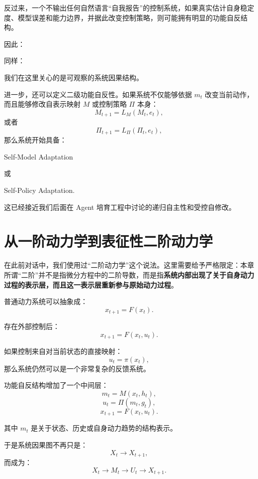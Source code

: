 反过来，一个不输出任何自然语言“自我报告”的控制系统，如果真实估计自身稳定度、模型误差和能力边界，并据此改变控制策略，则可能拥有明显的功能自反结构。

因此：
\begin{statementbox}
\centering
{}
\end{statementbox}

同样：
\begin{statementbox}
\centering
{}
\end{statementbox}

我们在这里关心的是可观察的系统因果结构。

进一步，还可以定义二级功能自反性。如果系统不仅能够依据 \(m_t\) 改变当前动作，而且能够修改自表示映射 \(M\) 或控制策略 \(\Pi\) 本身：
\[
M_{t+1}
=
L_M(M_t,e_t),
\]
或者
\[
\Pi_{t+1}
=
L_\Pi(\Pi_t,e_t),
\]
那么系统开始具备：
\begin{statementbox}
Self-Model Adaptation
\end{statementbox}
或
\begin{statementbox}
Self-Policy Adaptation.
\end{statementbox}

这已经接近我们后面在 Agent 培育工程中讨论的递归自主性和受控自修改。

\section{从一阶动力学到表征性二阶动力学}

在此前对话中，我们使用过“二阶动力学”这个说法。这里需要给予严格限定：本章所谓“二阶”并不是指微分方程中的二阶导数，而是指\textbf{系统内部出现了关于自身动力过程的表示层，而且这一表示层重新参与原始动力过程}。

普通动力系统可以抽象成：
\[
x_{t+1}=F(x_t).
\]

存在外部控制后：
\[
x_{t+1}=F(x_t,u_t).
\]

如果控制来自对当前状态的直接映射：
\[
u_t=\pi(x_t),
\]
那么系统仍然可以是一个非常复杂的反馈系统。

功能自反结构增加了一个中间层：
\[
m_t=M(x_t,h_t),
\]
\[
u_t=\Pi(m_t,g_t),
\]
\[
x_{t+1}=F(x_t,u_t).
\]

其中 \(m_t\) 是关于状态、历史或自身动力趋势的结构表示。

于是系统因果图不再只是：
\[
X_t\rightarrow X_{t+1},
\]
而成为：
\[
X_t
\rightarrow
M_t
\rightarrow
U_t
\rightarrow
X_{t+1}.
\]

